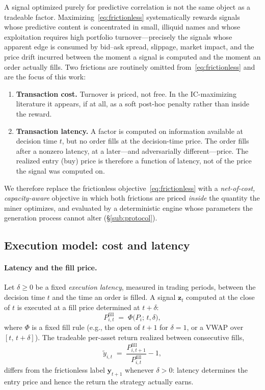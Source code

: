 \documentclass[11pt]{article}
\newcommand{\sign}{\mathbf{z}}
\begin{document}
A signal optimized purely for predictive correlation is not the same object as a
tradeable factor. Maximizing~\eqref{eq:frictionless} systematically rewards signals
whose predictive content is concentrated in small, illiquid names and whose exploitation
requires high portfolio turnover---precisely the signals whose apparent edge is consumed
by bid--ask spread, slippage, market impact, and the price drift incurred between the
moment a signal is computed and the moment an order actually fills. Two frictions are
routinely omitted from~\eqref{eq:frictionless} and are the focus of this work:
\begin{enumerate}[leftmargin=1.4em,itemsep=2pt]
  \item \textbf{Transaction cost.} Turnover is priced, not free. In the IC-maximizing
        literature it appears, if at all, as a soft post-hoc penalty rather than inside
        the reward.
  \item \textbf{Transaction latency.} A factor is computed on information available at
        decision time $t$, but no order fills at the decision-time price. The order
        fills after a nonzero latency, at a later---and adversarially different---price.
        The realized entry (buy) price is therefore a function of latency, not of the
        price the signal was computed on.
\end{enumerate}
We therefore replace the frictionless objective~\eqref{eq:frictionless} with a
\emph{net-of-cost, capacity-aware} objective in which both frictions are priced
\emph{inside} the quantity the miner optimizes, and evaluated by a deterministic engine
whose parameters the generation process cannot alter (\S\ref{sub:protocol}).

\subsection{Execution model: cost and latency}
\label{sub:exec}

\paragraph{Latency and the fill price.}
Let $\delta\ge 0$ be a fixed \emph{execution latency}, measured in trading periods,
between the decision time $t$ and the time an order is filled. A signal $\sign_t$
computed at the close of $t$ is executed at a fill price determined at $t+\delta$:
\begin{equation}
  P^{\mathrm{fill}}_{i,t} \;=\; \Phi\!\big(P_i;\,t,\delta\big),
  \label{eq:fill}
\end{equation}
where $\Phi$ is a fixed fill rule (e.g., the open of $t{+}1$ for $\delta{=}1$, or a
VWAP over $[t,\,t+\delta]$). The tradeable per-asset return realized between consecutive
fills,
\begin{equation}
  \tilde{y}_{i,t} \;=\; \frac{P^{\mathrm{fill}}_{i,t+1}}{P^{\mathrm{fill}}_{i,t}}-1,
  \label{eq:realized}
\end{equation}
differs from the frictionless label $\bm{y}_{t+1}$ whenever $\delta>0$: latency
determines the entry price and hence the return the strategy actually earns.
\end{document}
